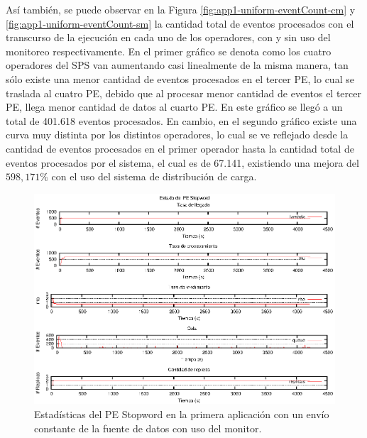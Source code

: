 Así también, se puede observar en la Figura \ref{fig:app1-uniform-eventCount-cm} y \ref{fig:app1-uniform-eventCount-sm} la cantidad total de eventos procesados con el transcurso de la ejecución en cada uno de los operadores, con y sin uso del monitoreo respectivamente. En el primer gráfico se denota como los cuatro operadores del SPS van aumentando casi linealmente de la misma manera, tan sólo existe una menor cantidad de eventos procesados en el tercer PE, lo cual se traslada al cuatro PE, debido que al procesar menor cantidad de eventos el tercer PE, llega menor cantidad de datos al cuarto PE. En este gráfico se llegó a un total de 401.618 eventos procesados. En cambio, en el segundo gráfico existe una curva muy distinta por los distintos operadores, lo cual se ve reflejado desde la cantidad de eventos procesados en el primer operador hasta la cantidad total de eventos procesados por el sistema, el cual es de 67.141, existiendo una mejora del $598,171\%$ con el uso del sistema de distribución de carga.

\begin{figure}[p]
\centering
    \includegraphics[scale=1.1]{images/exp/app1/uniform/cm/statusStopwordPE.eps}
    \caption{Estadísticas del PE Stopword en la primera aplicación con un envío constante de la fuente de datos con uso del monitor.}
    \label{fig:app1-uniform-statusStopwordPE-cm}
\end{figure}

